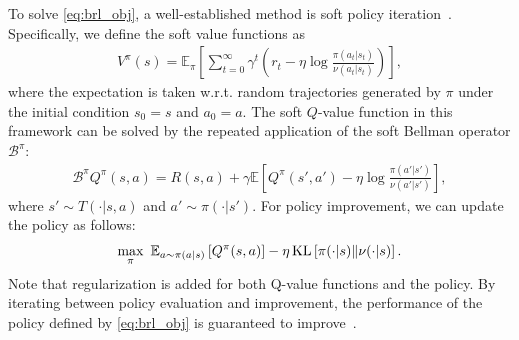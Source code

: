To solve \eqref{eq:brl_obj}, a well-established method is soft policy iteration~\citep{sac,brac}. Specifically, we define the soft value functions as
\begin{equation}\label{eq:expected_q}
    \begin{aligned}
        V^\pi(s)=\mathbb{E}_\pi\left[\sum_{t=0}^\infty\gamma^t\left(r_t-\eta\log\frac{\pi(a_t|s_t)}{\nu(a_t|s_t)}\right)\right], 
    \end{aligned}
\end{equation}
where the expectation is taken w.r.t. random trajectories generated by $\pi$ under the initial condition $s_0=s$ and $a_0=a$. The soft $Q$-value function in this framework can be solved by the repeated application of the soft Bellman operator $\mathcal{B}^\pi$:
\begin{equation}\label{eq:expected_bellman}
    \begin{aligned}
        \mathcal{B}^\pi Q^\pi(s, a)=R(s, a)+\gamma \mathbb{E}\left[Q^\pi(s', a')-\eta \log \frac{\pi(a'|s')}{\nu(a'|s')}\right],
    \end{aligned}
\end{equation}
where $s'\sim T(\cdot|s, a)$ and $a'\sim\pi(\cdot|s')$.
For policy improvement, we can update the policy as follows:
\begin{equation}\label{eq:expected_pi}
    \begin{aligned}
        \max_{\pi}\ \mathbb{E}_{a\sim \pi(a|s)}\left[Q^\pi(s, a)\right] - \eta\operatorname{KL}\left[\pi(\cdot|s)\|\nu(\cdot|s)\right]. 
    \end{aligned}
\end{equation}
Note that regularization is added for both Q-value functions and the policy. By iterating between policy evaluation and improvement, the performance of the policy defined by \eqref{eq:brl_obj} is guaranteed to improve~\citep{sac}. 



